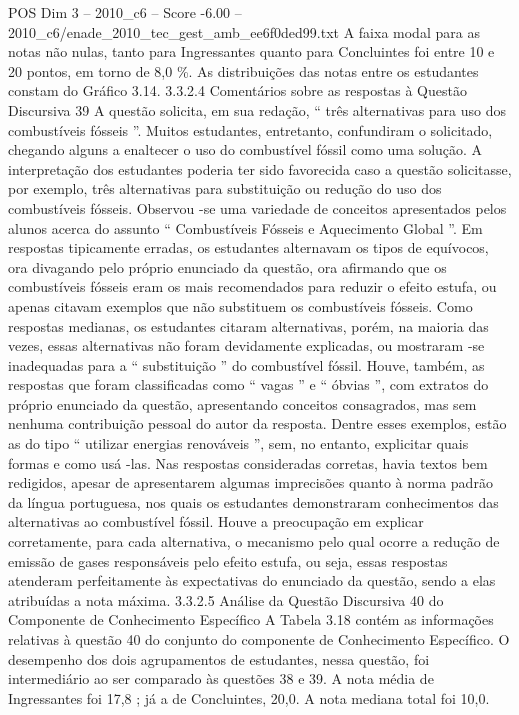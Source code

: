 \begin{textsample}{POS Dim 3 – 2010\_c6 – Score -6.00 – 2010\_c6/enade\_2010\_tec\_gest\_amb\_ee6f0ded99.txt}
A faixa modal para as notas não nulas, tanto para Ingressantes quanto para Concluintes foi entre 10 e 20 pontos, em torno de 8,0 \%.
As distribuições das notas entre os estudantes constam do Gráfico 3.14. 3.3.2.4 Comentários sobre as respostas à Questão Discursiva 39 A questão solicita, em sua redação, “ três alternativas para uso dos combustíveis fósseis ”.
Muitos estudantes, entretanto, confundiram o solicitado, chegando alguns a enaltecer o uso do combustível fóssil como uma solução.
A interpretação dos estudantes poderia ter sido favorecida caso a questão solicitasse, por exemplo, três alternativas para substituição ou redução do uso dos combustíveis fósseis.
Observou -se uma variedade de conceitos apresentados pelos alunos acerca do assunto “ Combustíveis Fósseis e Aquecimento Global ”.
Em respostas tipicamente erradas, os estudantes alternavam os tipos de equívocos, ora divagando pelo próprio enunciado da questão, ora afirmando que os combustíveis fósseis eram os mais recomendados para reduzir o efeito estufa, ou apenas citavam exemplos que não substituem os combustíveis fósseis.
Como respostas medianas, os estudantes citaram alternativas, porém, na maioria das vezes, essas alternativas não foram devidamente explicadas, ou mostraram -se inadequadas para a “ substituição ” do combustível fóssil.
Houve, também, as respostas que foram classificadas como “ vagas ” e “ óbvias ”, com extratos do próprio enunciado da questão, apresentando conceitos consagrados, mas sem nenhuma contribuição pessoal do autor da resposta.
Dentre esses exemplos, estão as do tipo “ utilizar energias renováveis ”, sem, no entanto, explicitar quais formas e como usá -las.
Nas respostas consideradas corretas, havia textos bem redigidos, apesar de apresentarem algumas imprecisões quanto à norma padrão da língua portuguesa, nos quais os estudantes demonstraram conhecimentos das alternativas ao combustível fóssil.
Houve a preocupação em explicar corretamente, para cada alternativa, o mecanismo pelo qual ocorre a redução de emissão de gases responsáveis pelo efeito estufa, ou seja, essas respostas atenderam perfeitamente às expectativas do enunciado da questão, sendo a elas atribuídas a nota máxima. 3.3.2.5 Análise da Questão Discursiva 40 do Componente de Conhecimento Específico A Tabela 3.18 contém as informações relativas à questão 40 do conjunto do componente de Conhecimento Específico.
O desempenho dos dois agrupamentos de estudantes, nessa questão, foi intermediário ao ser comparado às questões 38 e 39.
A nota média de Ingressantes foi 17,8 ; já a de Concluintes, 20,0.
A nota mediana total foi 10,0.

\end{textsample}
